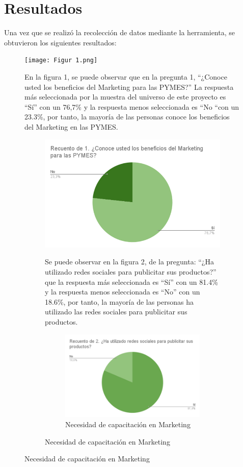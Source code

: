 \documentclass[12pt]{difu100cia} %
\begin{document}
\section{Resultados}

Una vez que se realizó la recolección de datos mediante la herramienta, se obtuvieron los siguientes resultados: 
\begin{figure}[!htb]
	\centering
	\texttt{[image: Figur 1.png]}
	\caption{Del conocimiento de los beneficios del marketing digital}
	

En la figura 1, se puede observar que en la pregunta 1, “¿Conoce usted los beneficios del Marketing para las PYMES?” La respuesta más seleccionada por la muestra del universo de este proyecto es “Sí” con un 76,7\% y la respuesta menos seleccionada es “No “con un 23.3\%, por tanto, la mayoría de las personas conoce los beneficios del Marketing en las PYMES.

\begin{figure}[!htb]
	\centering
	\includegraphics[width=\linewidth]{Figura 2.png}
	\caption{Utilización de redes sociales}
	
Se puede observar en la figura 2, de la pregunta: “¿Ha utilizado redes sociales para publicitar sus productos?” que la respuesta más seleccionada es “Sí” con un 81.4\% y la respuesta menos seleccionada es “No” con un 18.6\%, por tanto, la mayoría de las personas ha utilizado las redes sociales para publicitar sus productos.

\begin{figure}[!htb]
	\centering
	\includegraphics[width=\linewidth]{Figura 3.png}
	\caption{Necesidad de capacitación en Marketing}
	

\end{figure}
\end{figure}
\end{figure}
\end{document}
